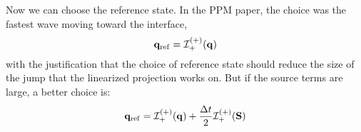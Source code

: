 \documentclass[times,modern]{aastex63}
\newcommand{\Sb}{{\bf S}}
\begin{document}
Now we can choose the reference state.  In the PPM paper, the choice was the fastest wave
moving toward the interface,
\begin{equation}
\qb_\refs = \Ic_+^\evp(\qb)
\end{equation}
with the justification that the choice of reference state should
reduce the size of the jump that the linearized projection works on.
But if the source terms are large, a better choice is:
\begin{equation}
\qb_\refs = \Ic_+^\evp(\qb) + \frac{\Delta t}{2} \Ic_+^\evp(\Sb)
\end{equation}




\end{document}
